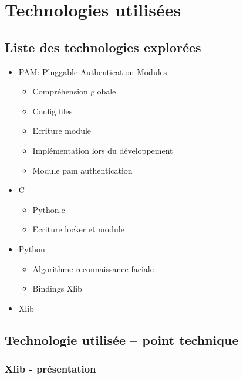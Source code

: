 \documentclass[french]{report}
\begin{document}
\chapter{Technologies utilisées}

\newpage

\section{Liste des technologies explorées}

\begin{itemize}[label=\textbullet, font=\normalfont \color{blue}]
  \item{PAM: Pluggable Authentication Modules}
  \begin{itemize}[label=\textbullet]
    \item{Compréhension globale}
    \item{Config files}
    \item{Ecriture module}
    \item{Implémentation lors du développement}
    \item{Module pam authentication}
  \end{itemize}
  \item{C}
  \begin{itemize}[label=\textbullet]
    \item{Python.c}
    \item{Ecriture locker et module}
  \end{itemize}
  \item{Python}
  \begin{itemize}[label=\textbullet]
    \item{Algorithme reconnaissance faciale}
    \item{Bindings Xlib}
  \end{itemize}
  \item{Xlib}
\end{itemize}

\section{Technologie utilisée – point technique}

\subsection{Xlib - présentation}
\end{document}
